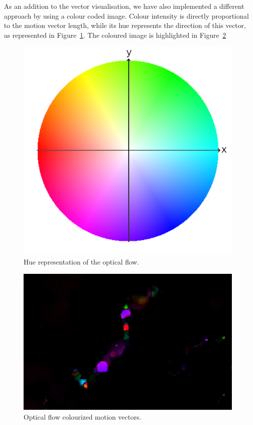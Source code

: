 \documentclass[12pt, a4paper]{report}
\begin{document}
	\par As an addition to the vector visualisation, we have also implemented a different approach by using a colour coded
image. Colour intensity is directly proportional to the motion vector length, while its
hue represents the direction of this vector, as represented in Figure~\ref{fig:hue_colour_wheel}. The coloured image is highlighted in Figure~\ref{fig:colored_of}
	
	\begin{figure}[h!]
		\centering
		\includegraphics[scale=0.2]{../images/colorwheel.png}
		\caption{Hue representation of the optical flow.}
		\label{fig:hue_colour_wheel}
	\end{figure}
	
	\begin{figure}[h!]
		\includegraphics[width=\linewidth]{../images/LC81940282013341LGN01_Motion Vectros_color_small.png}
		\caption{Optical flow colourized motion vectors.}
		\label{fig:colored_of}
	\end{figure}
	
\end{document}
